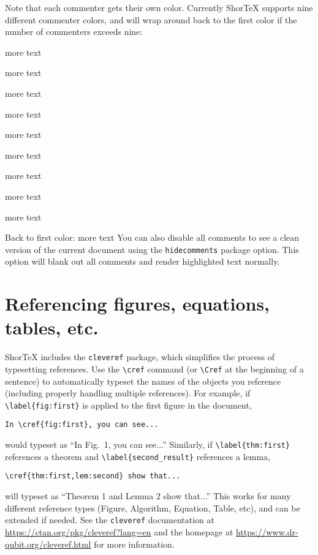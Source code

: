 \documentclass{article}
\begin{document}
Note that each commenter gets their own color. Currently ShorTeX supports nine different commenter colors,
and will wrap around back to the first color if the number of commenters exceeds nine:
\bitem
\setlength{\itemsep}{0pt}
\item {}more text
\item {}more text
\item {}more text
\item {}more text
\item {}more text
\item {}more text
\item {}more text
\item {}more text
\item {}more text
\item Back to first color: more text
\eitem
You can also disable all comments to see a clean version of the current 
document using the \verb!hidecomments! package option.
This option will blank out all comments and render highlighted text normally.

\newpage
\section{Referencing figures, equations, tables, etc.}

ShorTeX includes the \texttt{cleveref} package, which simplifies the process
of typesetting references. Use the \verb!\cref! command (or \verb!\Cref! at the beginning of a sentence) 
to automatically typeset the names of the objects you reference (including properly handling multiple references). 
For example, if \verb!\label{fig:first}! is applied to the first figure in the document,
\begin{verbatim}
In \cref{fig:first}, you can see...
\end{verbatim}
would typeset as ``In Fig.~1, you can see...''
Similarly, if \verb!\label{thm:first}! references a theorem and \verb!\label{second_result}! references
a lemma, 
\begin{verbatim}
\cref{thm:first,lem:second} show that...
\end{verbatim}
will typeset as ``Theorem 1 and Lemma 2 show that...''
This works for many different reference types (Figure, Algorithm, Equation, Table, etc),
and can be extended if needed. See the \texttt{cleveref} documentation 
at \url{https://ctan.org/pkg/cleveref?lang=en} and the homepage at \url{https://www.dr-qubit.org/cleveref.html} 
for more information.
\end{document}
